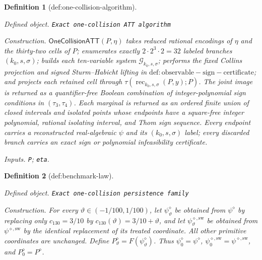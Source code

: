 \documentclass{article}
\newtheorem{definition}{Definition}
\begin{document}
\begin{definition}[def:one-collision-algorithm]\label{def:one-collision-algorithm}
\par\smallskip\noindent\emph{Defined object.} \texttt{Exact one-\allowbreak{}collision ATT algorithm}
\par\smallskip\noindent\emph{Construction.} \(\mathsf{OneCollisionATT}(P,\eta)\) takes reduced rational encodings of \(\eta\) and the thirty-two cells of \(P\); enumerates exactly \(2\cdot2^3\cdot2=32\) labeled branches \((k_0,s,\sigma)\); builds each ten-variable system \(\mathscr G_{k_0,s,\sigma}\); performs the fixed Collins projection and signed Sturm--Habicht lifting in \(\mathrm{def:observable-sign-certificate}\); and projects each retained cell through \(\tau(\operatorname{rec}_{k_0,s,\sigma}(P,y);P)\). The joint image is returned as a quantifier-free Boolean combination of integer-polynomial sign conditions in \((\tau_3,\tau_4)\). Each marginal is returned as an ordered finite union of closed intervals and isolated points whose endpoints have a square-free integer polynomial, rational isolating interval, and Thom sign sequence. Every endpoint carries a reconstructed real-algebraic \(\psi\) and its \((k_0,s,\sigma)\) label; every discarded branch carries an exact sign or polynomial infeasibility certificate.
\par\smallskip\noindent\emph{Inputs.} \texttt{P}; \texttt{eta}.
\end{definition}

\begin{definition}[def:benchmark-law]\label{def:benchmark-law}
\par\smallskip\noindent\emph{Defined object.} \texttt{Exact one-\allowbreak{}collision persistence family}
\par\smallskip\noindent\emph{Construction.} For every \(\vartheta\in(-1/100,1/100)\), let \(\psi^{\diamond}_{\vartheta}\) be obtained from \(\psi^{\diamond}\) by replacing only \(c_{130}=3/10\) by \(c_{130}(\vartheta)=3/10+\vartheta\), and let \(\psi^{\diamond,\mathrm{sw}}_{\vartheta}\) be obtained from \(\psi^{\diamond,\mathrm{sw}}\) by the identical replacement of its treated coordinate. All other primitive coordinates are unchanged. Define \(P^{\diamond}_{\vartheta}=F(\psi^{\diamond}_{\vartheta})\). Thus \(\psi^{\diamond}_{0}=\psi^{\diamond}\), \(\psi^{\diamond,\mathrm{sw}}_{0}=\psi^{\diamond,\mathrm{sw}}\), and \(P^{\diamond}_{0}=P^{\diamond}\).
\end{definition}
\end{document}

